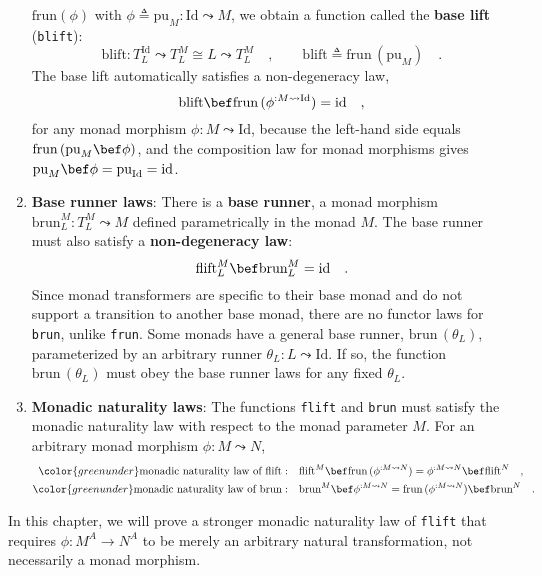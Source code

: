 \begin{enumerate}
$\text{frun}\left(\phi\right)$ with $\phi\triangleq\text{pu}_{M}:\text{Id}\leadsto M$,
we obtain a function called the \textbf{base
lift} (\lstinline!blift!):
\[
\text{blift}:T_{L}^{\text{Id}}\leadsto T_{L}^{M}\cong L\leadsto T_{L}^{M}\quad,\quad\quad\text{blift}\triangleq\text{frun}\,(\text{pu}_{M})\quad.
\]
The base lift automatically satisfies a non-degeneracy law,
\[
\text{blift}\bef\text{frun}\,(\phi^{:M\leadsto\text{Id}})=\text{id}\quad,
\]
for any monad morphism $\phi:M\leadsto\text{Id}$, because the left-hand
side equals $\text{frun}\,(\text{pu}_{M}\bef\phi)$, and the composition
law for monad morphisms gives $\text{pu}_{M}\bef\phi=\text{pu}_{\text{Id}}=\text{id}$.
\item \textbf{Base runner laws}:
There is a \textbf{base runner}, a monad morphism $\text{brun}_{L}^{M}:T_{L}^{M}\leadsto M$
defined parametrically in the monad $M$. The base runner must also
satisfy a \textbf{non-degeneracy law}:
\[
\text{flift}_{L}^{M}\bef\text{brun}_{L}^{M}=\text{id}\quad.
\]
Since monad transformers are specific to their base monad and do not
support a transition to another base monad, there are no functor laws
for \lstinline!brun!, unlike \lstinline!frun!. Some monads have
a general base runner, $\text{brun}\,(\theta_{L})$, parameterized
by an arbitrary runner $\theta_{L}:L\leadsto\text{Id}$. If so, the
function $\text{brun}\,(\theta_{L})$ must obey the base runner laws
for any fixed $\theta_{L}$.
\item \textbf{Monadic naturality laws}: 
The functions \lstinline!flift! and \lstinline!brun! must satisfy
the monadic naturality law with respect to the monad parameter $M$.
For an arbitrary monad morphism $\phi:M\leadsto N$,
\begin{align*}
{\color{greenunder}\text{monadic naturality law of }\text{flift}:}\quad & \text{flift}^{M}\bef\text{frun}\,(\phi^{:M\leadsto N})=\phi^{:M\leadsto N}\bef\text{flift}^{N}\quad,\\
{\color{greenunder}\text{monadic naturality law of }\text{brun}:}\quad & \text{brun}^{M}\bef\phi^{:M\leadsto N}=\text{frun}\,(\phi^{:M\leadsto N})\bef\text{brun}^{N}\quad.
\end{align*}
\end{enumerate}
In this chapter, we will prove a stronger monadic naturality law of
\lstinline!flift! that requires $\phi:M^{A}\rightarrow N^{A}$ to
be merely an arbitrary natural transformation, not necessarily a monad
morphism.

